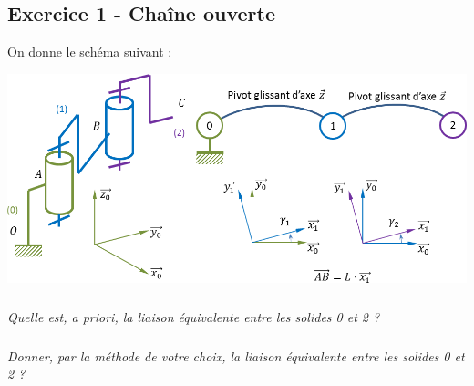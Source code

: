 \documentclass[10pt]{article}
\begin{document}


\subsection*{Exercice 1 - Chaîne ouverte}


On donne le schéma suivant : 

\begin{center}
\includegraphics[width=.75\textwidth]{images/co}
\end{center}

\subparagraph*{}
\textit{Quelle est, a priori, la liaison équivalente entre les solides 0 et 2 ?}


\subparagraph*{}
\textit{Donner, par la méthode de votre choix, la liaison équivalente entre les solides 0 et 2 ?}
\end{document}
